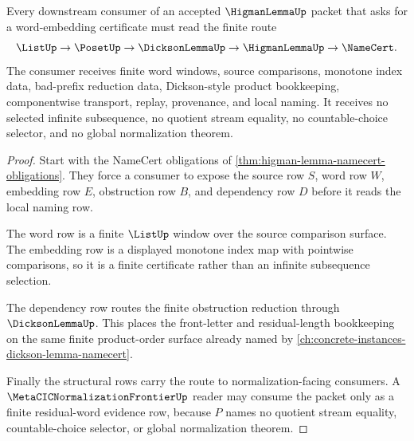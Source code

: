 \begin{theorem}
\label{thm:higman-lemma-subsequence-embedding-route}
Every downstream consumer of an accepted $\HigmanLemmaUp$ packet that asks for a word-embedding certificate must read the finite route
$$
\ListUp\to\PosetUp\to\DicksonLemmaUp\to\HigmanLemmaUp\to\NameCert .
$$
The consumer receives finite word windows, source comparisons, monotone index data, bad-prefix reduction data, Dickson-style product bookkeeping, componentwise transport, replay, provenance, and local naming. It receives no selected infinite subsequence, no quotient stream equality, no countable-choice selector, and no global normalization theorem.
\end{theorem}
\begin{proof}
Start with the NameCert obligations of \autoref{thm:higman-lemma-namecert-obligations}. They force a consumer to expose the source row $S$, word row $W$, embedding row $E$, obstruction row $B$, and dependency row $D$ before it reads the local naming row.

The word row is a finite $\ListUp$ window over the source comparison surface. The embedding row is a displayed monotone index map with pointwise comparisons, so it is a finite certificate rather than an infinite subsequence selection.

The dependency row routes the finite obstruction reduction through $\DicksonLemmaUp$. This places the front-letter and residual-length bookkeeping on the same finite product-order surface already named by \autoref{ch:concrete-instances-dickson-lemma-namecert}.

Finally the structural rows carry the route to normalization-facing consumers. A $\MetaCICNormalizationFrontierUp$ reader may consume the packet only as a finite residual-word evidence row, because $P$ names no quotient stream equality, countable-choice selector, or global normalization theorem.
\end{proof}

